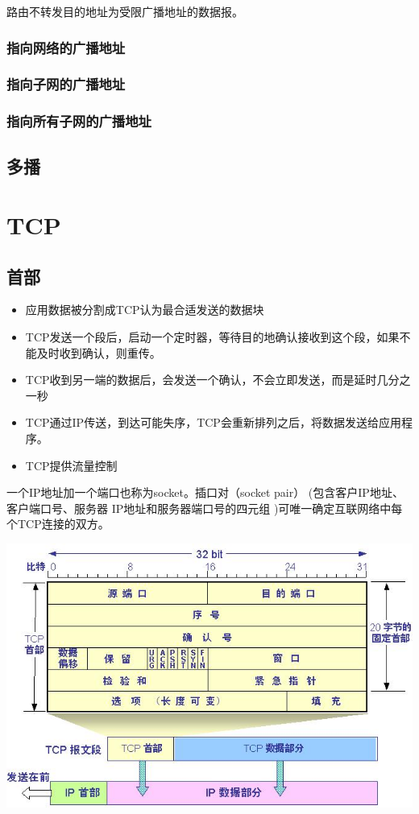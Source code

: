 路由不转发目的地址为受限广播地址的数据报。

\subsubsection{指向网络的广播地址}

\subsubsection{指向子网的广播地址}

\subsubsection{指向所有子网的广播地址}

\subsection{多播}



\section{TCP}

\subsection{首部}

\begin{itemize}
\item 应用数据被分割成TCP认为最合适发送的数据块
\item TCP发送一个段后，启动一个定时器，等待目的地确认接收到这个段，如果不能及时收到确认，则重传。
\item TCP收到另一端的数据后，会发送一个确认，不会立即发送，而是延时几分之一秒
\item TCP通过IP传送，到达可能失序，TCP会重新排列之后，将数据发送给应用程序。
\item TCP提供流量控制

\end{itemize}


一个IP地址加一个端口也称为socket。插口对（socket pair） (包含客户IP地址、客户端口号、服务器 IP地址和服务器端口号的四元组 )可唯一确定互联网络中每个TCP连接的双方。

\includegraphics[scale=3]{protocol/resources/TCP-header.jpg}


